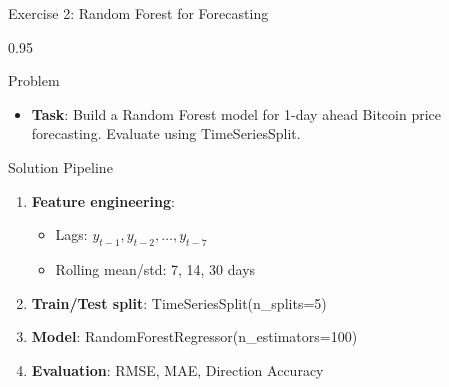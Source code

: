 \documentclass[9pt, aspectratio=169, t]{beamer}
\begin{document}
\begin{frame}{Exercise 2: Random Forest for Forecasting}
    \begin{cminipage}{0.95\textwidth}
    \begin{alertblock}{Problem}
        \begin{itemize}\setlength{\itemsep}{0pt}
            \item \textbf{Task}: Build a Random Forest model for 1-day ahead Bitcoin price forecasting. Evaluate using TimeSeriesSplit.
        \end{itemize}
    \end{alertblock}

    \vspace{0.2cm}
    \begin{exampleblock}{Solution Pipeline}
        \begin{enumerate}\setlength{\itemsep}{0pt}
            \item \textbf{Feature engineering}:
                \begin{itemize}\setlength{\itemsep}{0pt}
                    \item Lags: $y_{t-1}, y_{t-2}, \ldots, y_{t-7}$
                    \item Rolling mean/std: 7, 14, 30 days
                \end{itemize}
            \item \textbf{Train/Test split}: TimeSeriesSplit(n\_splits=5)
            \item \textbf{Model}: RandomForestRegressor(n\_estimators=100)
            \item \textbf{Evaluation}: RMSE, MAE, Direction Accuracy
        \end{enumerate}
    \end{exampleblock}
    \end{cminipage}
\end{frame}
\end{document}
